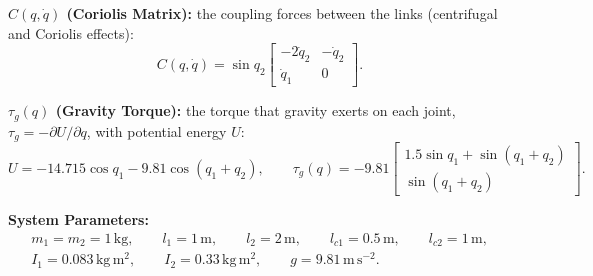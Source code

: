 \documentclass[12pt,a4paper]{article}
\begin{document}
\textbf{$C(q,\dot q)$ (Coriolis Matrix):} the coupling forces between the links (centrifugal and Coriolis effects):
\begin{equation}
C(q,\dot q)=\sin q_2\begin{bmatrix}-2\dot q_2 & -\dot q_2\\ \dot q_1 & 0\end{bmatrix}.
\end{equation}

\textbf{$\tau_g(q)$ (Gravity Torque):} the torque that gravity exerts on each joint, $\tau_g=-\partial U/\partial q$, with potential energy $U$:
\begin{equation}
U=-14.715\cos q_1-9.81\cos(q_1+q_2),\qquad
\tau_g(q)=-9.81\begin{bmatrix}1.5\sin q_1+\sin(q_1+q_2)\\ \sin(q_1+q_2)\end{bmatrix}.
\end{equation}

\textbf{System Parameters:}
\begin{gather*}
m_1=m_2=1\,\mathrm{kg},\qquad l_1=1\,\mathrm m,\qquad l_2=2\,\mathrm m,\qquad l_{c1}=0.5\,\mathrm m,\qquad l_{c2}=1\,\mathrm m,\\
I_1=0.083\,\mathrm{kg\,m^2},\qquad I_2=0.33\,\mathrm{kg\,m^2},\qquad g=9.81\,\mathrm{m\,s^{-2}}.
\end{gather*}
\end{document}
